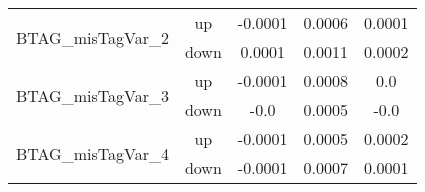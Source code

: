 \begin{table}[h!]
\begin{tabular}{lcccc}
\multirow{2}{*}{BTAG\_misTagVar\_2}      & up   &     -0.0001     &     0.0006     &     0.0001      \\
                                       & down &     0.0001     &     0.0011     &     0.0002       \\ \hline
\multirow{2}{*}{BTAG\_misTagVar\_3}      & up   &     -0.0001     &     0.0008     &     0.0      \\
                                       & down &     -0.0     &     0.0005     &     -0.0       \\ \hline
\multirow{2}{*}{BTAG\_misTagVar\_4}      & up   &     -0.0001     &     0.0005     &     0.0002      \\
                                       & down &     -0.0001     &     0.0007     &     0.0001       \\ \hline


\end{tabular}

\label{tab:systUnc_lep_fr}
\end{table}


